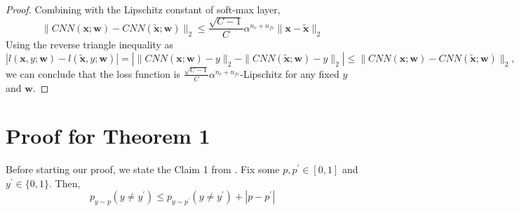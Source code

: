 \documentclass{article} \usepackage{iclr2018_conference,times}
\begin{document}
\begin{proof}
Combining with the Lipschitz constant of soft-max layer,
\[
\|CNN(\mathbf{x};\mathbf{w}) - CNN(\mathbf{\tilde{x}};\mathbf{w})\|_2 \leq   \frac{\sqrt{C-1}}{C} \alpha^{n_c+n_{fc}}  \|\mathbf{x}-\mathbf{\tilde{x}}\|_2
\]
Using the reverse triangle inequality as
\[
|l(\mathbf{x},y;\mathbf{w})-l(\mathbf{\tilde{x}},y;\mathbf{w})| = |\| CNN(\mathbf{x};\mathbf{w}) -y\|_2 -\|CNN(\mathbf{\tilde{x}};\mathbf{w})-y\|_2 | \leq \|CNN(\mathbf{x};\mathbf{w}) - CNN(\mathbf{\tilde{x}};\mathbf{w})\|_2,
\]
we can conclude that the loss function is $\frac{\sqrt{C-1}}{C} \alpha^{n_c+n_{fc}}$-Lipschitz for any fixed $y$ and $\mathbf{w}$.
\end{proof}

\section{Proof for Theorem 1}
Before starting our proof, we state the Claim 1 from \cite{BerlindU15}. Fix some $p,p^\prime \in [0,1]$ and $y^\prime \in \{0,1\}$. Then,
\[
p_{y \sim p}(y \neq y^\prime) \leq p_{y \sim p^\prime}(y \neq y^\prime) + |p - p^\prime|
\]
\end{document}
